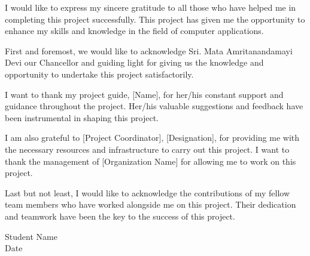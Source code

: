 

\begin{acknowledgements}      %
I would like to express my sincere gratitude to all those who have helped me in completing this project successfully. This project has given me the opportunity to enhance my skills and knowledge in the field of computer applications.

First and foremost, we would like to acknowledge Sri. Mata Amritanandamayi Devi our Chancellor and guiding light for giving us the knowledge and opportunity to undertake this project satisfactorily.

I want to thank my project guide, [Name], for her/his constant support and guidance throughout the project. Her/his valuable suggestions and feedback have been instrumental in shaping this project.

I am also grateful to [Project Coordinator], [Designation], for providing me with the necessary resources and infrastructure to carry out this project. I want to thank the management of [Organization Name] for allowing me to work on this project.

Last but not least, I would like to acknowledge the contributions of my fellow team members who have worked alongside me on this project. Their dedication and teamwork have been the key to the success of this project.
\begin{flushright}
Student Name\\
Date
\end{flushright}


\end{acknowledgements}


